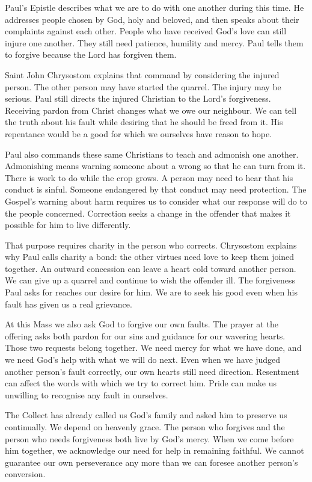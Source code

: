 Paul's Epistle describes what we are to do with one another during this
time. He addresses people chosen by God, holy and beloved, and then
speaks about their complaints against each other. People who have
received God's love can still injure one another. They still need
patience, humility and mercy. Paul tells them to forgive because the
Lord has forgiven them.

Saint John Chrysostom explains that command by considering the injured
person. The other person may have started the quarrel. The injury may
be serious. Paul still directs the injured Christian to the Lord's
forgiveness. Receiving pardon from Christ changes what we owe our
neighbour. We can tell the truth about his fault while desiring that
he should be freed from it. His repentance would be a good for which
we ourselves have reason to hope.

Paul also commands these same Christians to teach and admonish one
another. Admonishing means warning someone about a wrong so that he
can turn from it. There is work to do while the crop grows. A person
may need to hear that his conduct is sinful. Someone endangered by
that conduct may need protection. The Gospel's warning about harm
requires us to consider what our response will do to the people
concerned. Correction seeks a change in the offender that makes it
possible for him to live differently.

That purpose requires charity in the person who corrects. Chrysostom
explains why Paul calls charity a bond: the other virtues need love
to keep them joined together. An outward concession can leave a heart
cold toward another person. We can give up a quarrel and continue to
wish the offender ill. The forgiveness Paul asks for reaches our
desire for him. We are to seek his good even when his fault has
given us a real grievance.

At this Mass we also ask God to forgive our own faults. The prayer at
the offering asks both pardon for our sins and guidance for our
wavering hearts. Those two requests belong together. We need mercy
for what we have done, and we need God's help with what we will do
next. Even when we have judged another person's fault correctly,
our own hearts still need direction. Resentment can affect the words
with which we try to correct him. Pride can make us unwilling to
recognise any fault in ourselves.

The Collect has already called us God's family and asked him to
preserve us continually. We depend on heavenly grace. The person
who forgives and the person who needs forgiveness both live by
God's mercy. When we come before him together, we acknowledge our
need for help in remaining faithful. We cannot guarantee our own
perseverance any more than we can foresee another person's conversion.

